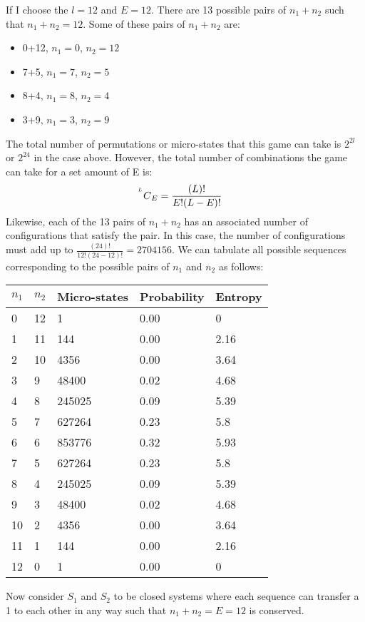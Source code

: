 \vspace{0,3cm}
If I choose the $l=12$ and $E=12$. There are 13 possible pairs of $n_{1}+n_{2}$ such that $n_{1}+n_{2}=12$. Some of these pairs of $n_{1}+n_{2}$ are:
\begin{itemize}
    \item 0+12, $n_{1}=0$, $n_{2}=12$
    \item 7+5, $n_{1}=7$, $n_{2}=5$
    \item 8+4, $n_{1}=8$, $n_{2}=4$
    \item 3+9, $n_{1}=3$, $n_{2}=9$
\end{itemize}
The total number of permutations or micro-states that this game can take is $2^{2l}$ or $2^{24}$ in the case above. However, the total number of combinations the game can take for a set amount of E is: 
\begin{equation}
    \prescript{^L\mkern-0.5mu}{}C_{E} = \frac{(L)!}{E!(L-E)!}\quad
    \label{Eq:Combination}
\end{equation}
Likewise, each of the 13 pairs of $n_{1}+n_{2}$ has an associated number of configurations that satisfy the pair. In this case, the number of configurations must add up to $\frac{(24)!}{12!(24-12)!}=2704156$. 
We can tabulate all possible sequences corresponding to the possible pairs of $n_{1}$ and $n_{2}$ as follows: 
\begin{center}
\begin{tabular}{ |p{2cm}|p{2cm}|p{3cm}|p{2.4cm}|p{2cm}|  }
 \hline
$n_{1}$& $n_{2}$ & Micro-states & Probability & Entropy\\
 \hline
 0   & 12 &1&0.00&0\\
 1&   11 &144&0.00&2.16\\
 2&10& 4356& 0.00&3.64\\
 3&9 & 48400&0.02&4.68\\
 4&8 &245025&0.09&5.39\\
 5&7 & 627264&0.23&5.8\\
 6&6 & 853776&0.32&5.93\\
 7&5 & 627264&0.23&5.8\\
 8&4 & 245025&0.09&5.39\\
 9&3 & 48400&0.02&4.68\\
 10&2 & 4356&0.00&3.64\\
 11&1 & 144&0.00&2.16\\
 12&0 & 1&0.00&0\\
 \hline
\end{tabular}
\end{center} 
Now consider $S_{1}$ and $S_{2}$ to be closed systems where each sequence can transfer a 1 to each other in any way such that $n_{1}+n_{2}=E=12$ is conserved.\par
\pagebreak

